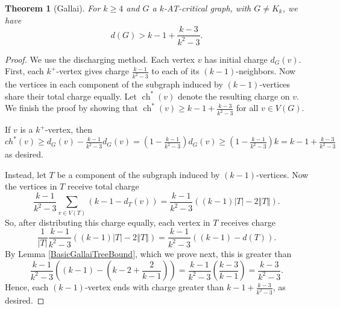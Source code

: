 \documentclass[12pt]{article}
\theoremstyle{plain}
\newtheorem{thm}{Theorem}[section]
\theoremstyle{definition}
\theoremstyle{remark}
\newcommand{\size}[1]{\left\Vert#1\right\Vert}
\newcommand{\parens}[1]{\left( #1 \right)}
\newcommand{\ch}{\operatorname{ch}}
\begin{document}
\begin{thm}[Gallai]
\label{thm:Gallai}
	For $k \ge 4$ and $G$ a $k$-AT-critical graph, with $G \ne K_k$, we have
	\[d(G) > k-1 + \frac{k-3}{k^2-3}.\]
\end{thm}
\begin{proof}
We use the discharging method. Each vertex $v$ has initial charge $d_G(v)$. 
First, each $k^+$-vertex gives charge $\frac{k-1}{k^2-3}$ to each of its
$(k-1)$-neighbors.  Now the vertices in each component of the subgraph induced
by $(k-1)$-vertices share their total charge equally.  Let $\ch^*(v)$ denote the
resulting charge on $v$.  We finish the proof by showing that $\ch^*(v) \ge k-1
+ \frac{k-3}{k^2-3}$ for all $v \in V(G)$.
	
If $v$ is a $k^+$-vertex, then $ch^*(v) \ge d_G(v) - \frac{k-1}{k^2-3}d_G(v) =
\parens{1- \frac{k-1}{k^2-3}}d_G(v) \ge \parens{1- \frac{k-1}{k^2-3}}k = k-1 +
\frac{k-3}{k^2-3}$ as desired.

Instead, let $T$ be a component of the subgraph induced by $(k-1)$-vertices. 
Now the vertices in $T$ receive total charge 
\[\frac{k-1}{k^2-3}\sum_{v \in V(T)} (k-1 - d_T(v)) =
\frac{k-1}{k^2-3}\parens{(k-1)|T| - 2\size{T}}.\]
So, after distributing this charge equally, each vertex in $T$ receives charge
\[\frac{1}{|T|}\frac{k-1}{k^2-3}((k-1)|T| - 2\size{T}) = \frac{k-1}{k^2-3}\parens{(k-1) - d(T)}.\]
By Lemma \ref{BasicGallaiTreeBound}, which we prove next, this is greater than
\[\frac{k-1}{k^2-3}\parens{(k-1) - \parens{k-2 + \frac{2}{k-1}}} = \frac{k-1}{k^2-3}\parens{\frac{k-3}{k-1}} = \frac{k-3}{k^2-3}.\]
Hence, each $(k-1)$-vertex ends with charge greater than $k-1 +
\frac{k-3}{k^2-3}$, as desired.
\end{proof}
\end{document}
